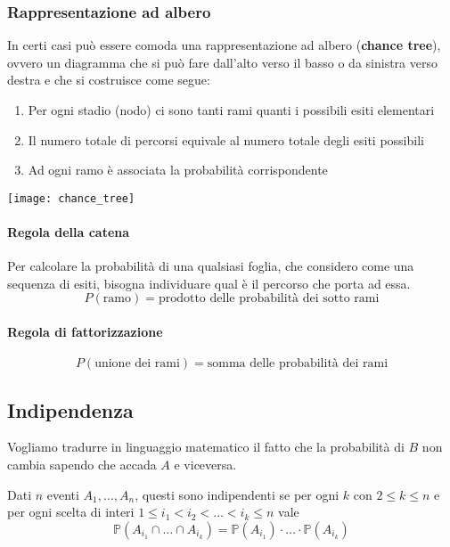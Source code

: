 \subsubsection{Rappresentazione ad albero}
In certi casi può essere comoda una rappresentazione ad albero (\textbf{chance tree}), ovvero un diagramma che si può fare dall'alto verso il basso o da sinistra verso destra e che si costruisce come segue:
\begin{enumerate}
	\item Per ogni stadio (nodo) ci sono tanti rami quanti i possibili esiti elementari
	\item Il numero totale di percorsi equivale al numero totale degli esiti possibili
	\item Ad ogni ramo è associata la probabilità corrispondente
\end{enumerate}
\begin{center}
	\texttt{[image: chance\_tree]}
\end{center}

\paragraph{Regola della catena} Per calcolare la probabilità di una qualsiasi foglia, che considero come una sequenza di esiti, bisogna individuare qual è il percorso che porta ad essa.
\begin{equation}
	P(\text{ramo}) = \text{prodotto delle probabilità dei sotto rami}
\end{equation}

\paragraph{Regola di fattorizzazione}
\begin{equation}
	P(\text{unione dei rami}) = \text{somma delle probabilità dei rami}
\end{equation}

\subsection{Indipendenza}
Vogliamo tradurre in linguaggio matematico il fatto che la probabilità di $B$ non cambia sapendo che accada $A$ e viceversa.
\begin{definition}
	Dati $n$ eventi $A_1, \ldots, A_n$, questi sono indipendenti se per ogni $k$ con $2 \leq k \leq n$ e per ogni scelta di interi $1 \leq i_1 < i_2< \ldots < i_k \leq n$ vale
	\begin{equation}
		\mathbb{P}(A_{i_1} \cap \ldots \cap A_{i_k}) = \mathbb{P}(A_{i_1}) \cdot  \ldots \cdot \mathbb{P}(A_{i_k})
	\end{equation}
\end{definition}

